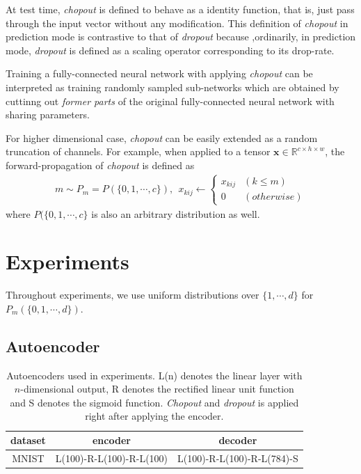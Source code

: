 \documentclass{article}
\begin{document}
    At test time, \textit{chopout} is defined to behave as a identity function, that is, just pass through the input vector without any modification. This definition of \textit{chopout} in prediction mode is contrastive to that of \textit{dropout} because ,ordinarily, in prediction mode, \textit{dropout} is defined as a scaling operator corresponding to its drop-rate.
    
    Training a fully-connected neural network with applying \textit{chopout} can be interpreted as training randomly sampled sub-networks which are obtained by cuttinng out \textit{former parts} of the original fully-connected neural network with sharing parameters.

    For higher dimensional case, \textit{chopout} can be easily extended as a random truncation of channels.  For example, when applied to a tensor $\mathbf{x} \in \mathbb{R}^{c \times h \times w}$, the forward-propagation of \textit{chopout} is defined as
    \begin{align}
        m \sim P_m = P(\{0, 1, \cdots, c\}), \ \ 
        x_{kij} \leftarrow \begin{cases}
            x_{kij} & (k \leq m) \\
            0 & (otherwise)
            \end{cases} \nonumber
    \end{align}
    where $P(\{0, 1, \cdots, c\}$ is also an arbitrary distribution as well.

    \section{Experiments}
    \label{experiments}
    
    Throughout experiments, we use uniform distributions over $\{1, \cdots, d\}$ for $P_m(\{0, 1, \cdots, d\})$.

    \subsection{Autoencoder}

    \begin{table}
        \caption{Autoencoders used in experiments. L(n) denotes the linear layer with $n$-dimensional output, R denotes the rectified linear unit function and S denotes the sigmoid function. \textit{Chopout} and \textit{dropout} is applied right after applying the encoder.}    
        \centering
        \begin{tabular}{c|c|c}
            dataset & encoder & decoder \\ \hline \hline
            MNIST & L(100)-R-L(100)-R-L(100) & L(100)-R-L(100)-R-L(784)-S
        \end{tabular}
        \label{tab:mnist_ae}
    \end{table}
    
\end{document}

